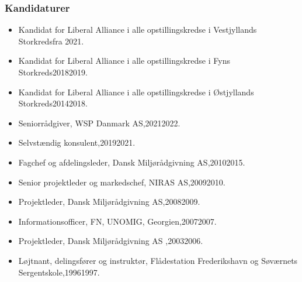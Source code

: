\documentclass[11pt, a4paper]{awesome-cv}
\begin{document}
\begin{cvletter}
\subsubsection*{Kandidaturer}
\begin{itemize}
\item Kandidat for Liberal Alliance i alle opstillingskredse i Vestjyllands Storkredsfra 2021.
\item Kandidat for Liberal Alliance i alle opstillingskredse i Fyns Storkreds20182019.
\item Kandidat for Liberal Alliance i alle opstillingskredse i Østjyllands Storkreds20142018.
\end{itemize}
\begin{itemize}
\item Seniorrådgiver, WSP Danmark AS,20212022.
\item Selvstændig konsulent,20192021.
\item Fagchef og afdelingsleder, Dansk Miljørådgivning AS,20102015.
\item Senior projektleder og markedschef, NIRAS AS,20092010.
\item Projektleder, Dansk Miljørådgivning AS,20082009.
\item Informationsofficer, FN, UNOMIG, Georgien,20072007.
\item Projektleder, Dansk Miljørådgivning AS ,20032006.
\item Løjtnant, delingsfører og instruktør, Flådestation Frederikshavn og Søværnets Sergentskole,19961997.
\end{itemize}
\end{cvletter}
\end{document}
